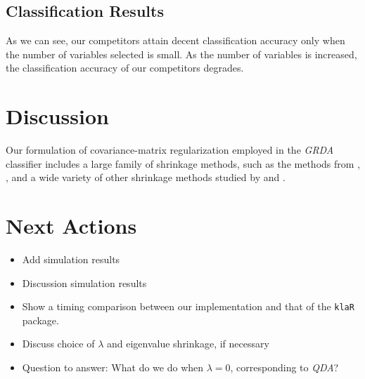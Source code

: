 \documentclass[11pt]{article}
\begin{document}
\subsection{Classification Results}

As we can see, our competitors attain decent classification accuracy only when the number of variables selected is small. As the number of variables is increased, the classification accuracy of our competitors degrades.

\section{Discussion}

Our formulation of covariance-matrix regularization employed in the \emph{GRDA} classifier includes a large family of shrinkage methods, such as the methods from \cite{Srivastava:2007ww}, \cite{Rao:1971ul}, and a wide variety of other shrinkage methods studied by \cite{Ramey:2011ji} and \cite*{Xu:2009fl}.


\section{Next Actions}

\begin{itemize}
\item Add simulation results
\item Discussion simulation results
\item Show a timing comparison between our implementation and that of the {\tt klaR} package.
\item Discuss choice of $\lambda$ and eigenvalue shrinkage, if necessary
\item Question to answer: What do we do when $\lambda = 0$, corresponding to \emph{QDA}?
\end{itemize}

	



\end{document}
